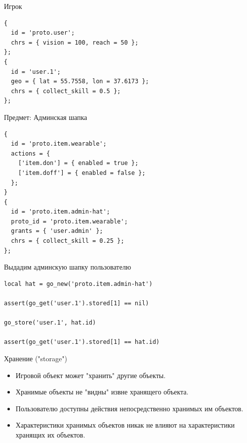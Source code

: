 \documentclass[aspectratio=169,handout,bigger]{beamer}
\begin{document}

\begin{frame}[fragile]{Игрок}
\begin{verbatim}
{
  id = 'proto.user';
  chrs = { vision = 100, reach = 50 };
};
{
  id = 'user.1';
  geo = { lat = 55.7558, lon = 37.6173 };
  chrs = { collect_skill = 0.5 };
};
\end{verbatim}
\end{frame}


\begin{frame}[fragile]{Предмет: Админская шапка}
\begin{verbatim}
{
  id = 'proto.item.wearable';
  actions = {
    ['item.don'] = { enabled = true };
    ['item.doff'] = { enabled = false };
  };
}
{
  id = 'proto.item.admin-hat';
  proto_id = 'proto.item.wearable';
  grants = { 'user.admin' };
  chrs = { collect_skill = 0.25 };
};
\end{verbatim}
\end{frame}


\begin{frame}[fragile]{Выдадим админскую шапку пользователю}
\begin{verbatim}
local hat = go_new('proto.item.admin-hat')

assert(go_get('user.1').stored[1] == nil)

go_store('user.1', hat.id)

assert(go_get('user.1').stored[1] == hat.id)
\end{verbatim}
\end{frame}


\begin{frame}{Хранение ("storage")}
  \begin{itemize}
    \item Игровой объект может "хранить" другие объекты.
    \item Хранимые объекты не "видны" извне хранящего объекта.
    \item Пользователю доступны действия
          непосредственно хранимых им объектов.
    \item Характеристики хранимых объектов никак не влияют
          на характеристики хранящих их объектов.
  \end{itemize}
\end{frame}
\end{document}

